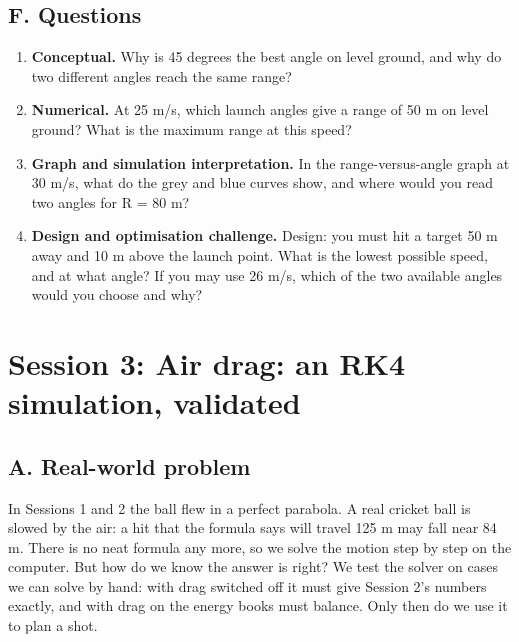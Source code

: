 \documentclass[11pt,a4paper]{article}
\begin{document}
\subsection*{F. Questions}
\begin{enumerate}[nosep]
\item \textbf{Conceptual.} Why is 45 degrees the best angle on level ground, and why do two different angles reach the same range?
\item \textbf{Numerical.} At 25 m/s, which launch angles give a range of 50 m on level ground? What is the maximum range at this speed?
\item \textbf{Graph and simulation interpretation.} In the range-versus-angle graph at 30 m/s, what do the grey and blue curves show, and where would you read two angles for R = 80 m?
\item \textbf{Design and optimisation challenge.} Design: you must hit a target 50 m away and 10 m above the launch point. What is the lowest possible speed, and at what angle? If you may use 26 m/s, which of the two available angles would you choose and why?
\end{enumerate}

\section{Session 3: Air drag: an RK4 simulation, validated}

\subsection*{A. Real-world problem}
In Sessions 1 and 2 the ball flew in a perfect parabola. A real cricket ball is slowed by the air: a hit that the formula says will travel 125 m may fall near 84 m. There is no neat formula any more, so we solve the motion step by step on the computer. But how do we know the answer is right? We test the solver on cases we can solve by hand: with drag switched off it must give Session 2's numbers exactly, and with drag on the energy books must balance. Only then do we use it to plan a shot.
\end{document}
